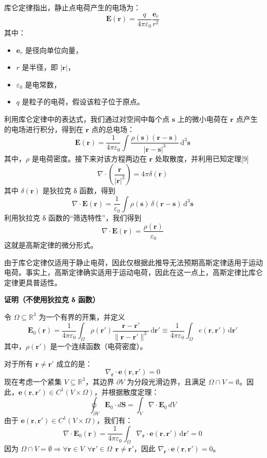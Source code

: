 库仑定律指出，静止点电荷产生的电场为：
\[
\mathbf{E} (\mathbf{r}) = \frac{q}{4 \pi \varepsilon_0} \frac{\mathbf{e}_r}{r^2}~
\]
其中：
\begin{itemize}
\item \(\mathbf{e}_r\) 是径向单位向量，
\item \(r\) 是半径，即 \(|\mathbf{r}|\)，
\item \(\varepsilon_0\) 是电常数，
\item \(q\) 是粒子的电荷，假设该粒子位于原点。
\end{itemize}
利用库仑定律中的表达式，我们通过对空间中每个点 \( \mathbf{s} \) 上的微小电荷在 \( \mathbf{r} \) 点产生的电场进行积分，得到在 \( \mathbf{r} \) 点的总电场：
\[
\mathbf{E} (\mathbf{r}) = \frac{1}{4 \pi \varepsilon_0} \int \frac{\rho (\mathbf{s}) (\mathbf{r} - \mathbf{s})}{|\mathbf{r} - \mathbf{s}|^3} \, \mathrm{d}^3 \mathbf{s}~
\]
其中，\(\rho\) 是电荷密度。接下来对该方程两边在 \( \mathbf{r} \) 处取散度，并利用已知定理[9]
\[
\nabla \cdot \left( \frac{\mathbf{r}}{|\mathbf{r}|^3} \right) = 4 \pi \delta (\mathbf{r})~
\]
其中 \(\delta(\mathbf{r})\) 是狄拉克 δ 函数，得到
\[
\nabla \cdot \mathbf{E} (\mathbf{r}) = \frac{1}{\varepsilon_0} \int \rho (\mathbf{s}) \, \delta (\mathbf{r} - \mathbf{s}) \, \mathrm{d}^3 \mathbf{s}~
\]
利用狄拉克 δ 函数的“筛选特性”，我们得到
\[
\nabla \cdot \mathbf{E} (\mathbf{r}) = \frac{\rho (\mathbf{r})}{\varepsilon_0}~
\]
这就是高斯定律的微分形式。

由于库仑定律仅适用于静止电荷，因此仅根据此推导无法预期高斯定律适用于运动电荷。事实上，高斯定律确实适用于运动电荷，因此在这一点上，高斯定律比库仑定律更具普适性。

\textbf{证明（不使用狄拉克 δ 函数）}

令 \(\Omega \subseteq \mathbb{R}^3\) 为一个有界的开集，并定义
\[
\mathbf{E}_0(\mathbf{r}) = \frac{1}{4\pi \varepsilon_0} \int_{\Omega} \rho(\mathbf{r'}) \frac{\mathbf{r} - \mathbf{r'}}{\|\mathbf{r} - \mathbf{r'}\|^3} \, \mathrm{d} \mathbf{r'} \equiv \frac{1}{4\pi \varepsilon_0} \int_{\Omega} e(\mathbf{r}, \mathbf{r'}) \, \mathrm{d} \mathbf{r'}~
\]
其中，\(\rho(\mathbf{r'})\) 是一个连续函数（电荷密度）。

对于所有 \(\mathbf{r} \neq \mathbf{r'}\) 成立的是：
\[
\nabla_{\mathbf{r}} \cdot \mathbf{e}(\mathbf{r}, \mathbf{r'}) = 0~
\]
现在考虑一个紧集 \(V \subseteq \mathbb{R}^3\)，其边界 \(\partial V\) 为分段光滑边界，且满足 \(\Omega \cap V = \emptyset\)。因此，\(\mathbf{e}(\mathbf{r}, \mathbf{r'}) \in C^1(V \times \Omega)\)，并根据散度定理：
\[
\oint_{\partial V} \mathbf{E}_0 \cdot d\mathbf{S} = \int_V \nabla \cdot \mathbf{E}_0 \, dV~
\]
由于 \(\mathbf{e}(\mathbf{r}, \mathbf{r'}) \in C^1(V \times \Omega)\)，我们有：
\[
\nabla \cdot \mathbf{E}_0(\mathbf{r}) = \frac{1}{4 \pi \varepsilon_0} \int_{\Omega} \nabla_{\mathbf{r}} \cdot \mathbf{e}(\mathbf{r}, \mathbf{r'}) \, \mathrm{d} \mathbf{r'} = 0~
\]
因为 \(\Omega \cap V = \emptyset \Rightarrow \forall \mathbf{r} \in V \ \ \forall \mathbf{r'} \in \Omega \ \ \mathbf{r} \neq \mathbf{r'}\)，因此 \(\nabla_{\mathbf{r}} \cdot \mathbf{e}(\mathbf{r}, \mathbf{r'}) = 0\)。